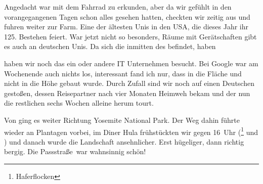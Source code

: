 Angedacht war  mit dem Fahrrad zu erkunden, aber da wir gefühlt in den vorangegangenen Tagen schon alles gesehen hatten, checkten wir zeitig aus und fuhren weiter zur \glqq Farm\grqq.
Eine der ältesten Unis in den USA, die dieses Jahr ihr 125. Bestehen feiert.
War jetzt nicht so besonders, Räume mit Gerätschaften gibt es auch an deutschen Unis.
Da sich die  inmitten des  befindet, haben 


\vspace*{.35\paperheight}

\noindent
haben wir noch das ein oder andere IT Unternehmen besucht.
Bei Google war am Wochenende auch nichts los, interessant fand ich nur, dass in die Fläche und nicht in die Höhe gebaut wurde.
Durch Zufall sind wir noch auf einen Deutschen gestoßen, dessen Reisepartner nach vier Monaten Heimweh bekam und der nun die restlichen sechs Wochen alleine herum tourt.

Von  ging es weiter Richtung Yosemite National Park.
Der Weg dahin führte wieder an Plantagen vorbei, im Diner Hula frühstückten wir gegen 16~Uhr (\footnote{Haferflocken} und ) und danach wurde die Landschaft ansehnlicher.
Erst hügeliger, dann richtig bergig.
Die \glqq Passstraße\grqq \, war wahnsinnig schön!

